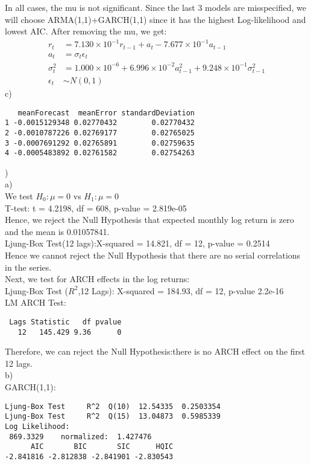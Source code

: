 \documentclass[12pt]{article}
\begin{document}
In all cases, the mu is not significant. Since the last 3 models are misspecified, we will choose ARMA(1,1)+GARCH(1,1) since it has the highest Log-likelihood and lowest AIC. After removing the mu, we get:
\begin{equation*}
\begin{split}
r_{t} &= 7.130\times 10^{-1}r_{t-1}+a_{t}-7.677\times 10^{-1}a_{t-1}\\
a_{t} &= \sigma_{t} \epsilon_{t}\\
\sigma^{2}_{t} &= 1.000\times 10^{-6}+6.996\times 10^{-2}a^{2}_{t-1}+9.248\times 10^{-1}\sigma_{t-1}^{2}\\
\epsilon_{t} &\sim N(0,1)
\end{split}
\end{equation*}
c)\\
\begin{verbatim}
   meanForecast  meanError standardDeviation
1 -0.0015129348 0.02770432        0.02770432
2 -0.0010787226 0.02769177        0.02765025
3 -0.0007691292 0.02765891        0.02759635
4 -0.0005483892 0.02761582        0.02754263
\end{verbatim}
)\\
\bigskip
a)\\
\bigskip
We test $H_{0}:\mu=0$ vs $H_{1}:\mu= 0$\\
T-test: t = 4.2198, df = 608, p-value = 2.819e-05\\
Hence, we reject the Null Hypothesis that expected monthly log return is zero and the mean is 0.01057841.\\
Ljung-Box Test(12 lags):X-squared = 14.821, df = 12, p-value = 0.2514\\
Hence we cannot reject the Null Hypothesis that there are no serial correlations in the series.\\
Next, we test for ARCH effects in the log returns:\\
Ljung-Box Test ($R^2$,12 Lags): X-squared = 184.93, df = 12, p-value \le 2.2e-16\\
LM ARCH Test:\\
\begin{verbatim}
 Lags Statistic   df pvalue
   12   145.429 9.36      0
\end{verbatim}
Therefore, we can reject the Null Hypothesis:there is no ARCH effect on the first 12 lags.\\
\bigskip
b)\\
\bigskip
GARCH(1,1):\\
\begin{verbatim}
Ljung-Box Test     R^2  Q(10)  12.54335  0.2503354   
Ljung-Box Test     R^2  Q(15)  13.04873  0.5985339 
Log Likelihood:
 869.3329    normalized:  1.427476
      AIC       BIC       SIC      HQIC 
-2.841816 -2.812838 -2.841901 -2.830543  
\end{verbatim}
\end{document}
